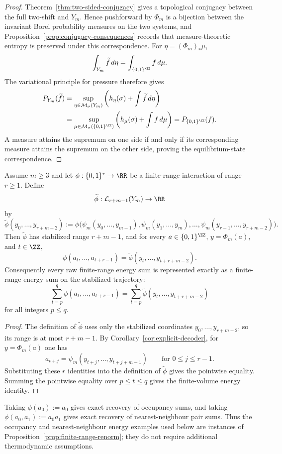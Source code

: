 \begin{proof}
Theorem~\ref{thm:two-sided-conjugacy} gives a topological conjugacy between
the full two-shift and $Y_m$.  Hence pushforward by $\Phi_m$ is a bijection
between the invariant Borel probability measures on the two systems, and
Proposition~\ref{prop:conjugacy-consequences} records that measure-theoretic
entropy is preserved under this correspondence.  For
$\eta=(\Phi_m)_*\mu$,
\[
\int_{Y_m}\widetilde f\,d\eta
=
\int_{\{0,1\}^{\ZZ}} f\,d\mu .
\]
The variational principle for pressure \cite{Walters1982} therefore gives
\[
\begin{aligned}
P_{Y_m}(\widetilde f)
&=\sup_{\eta\in\mathcal M_\sigma(Y_m)}
\left(h_\eta(\sigma)+\int\widetilde f\,d\eta\right)\\
&=\sup_{\mu\in\mathcal M_\sigma(\{0,1\}^{\ZZ})}
\left(h_\mu(\sigma)+\int f\,d\mu\right)
=P_{\{0,1\}^{\ZZ}}(f).
\end{aligned}
\]
A measure attains the supremum on one side if and only if its corresponding
measure attains the supremum on the other side, proving the equilibrium-state
correspondence.
\end{proof}

\begin{proposition}\label{prop:finite-range-renorm}
Assume $m\ge3$ and let $\phi:\{0,1\}^r\to\RR$ be a finite-range interaction
of range $r\ge1$.  Define
\[
\widetilde\phi:\mathcal L_{r+m-1}(Y_m)\to\RR
\]
by
\[
\widetilde\phi(y_0,\ldots,y_{r+m-2})
:=
\phi\bigl(
\psi_m(y_0,\ldots,y_{m-1}),
\psi_m(y_1,\ldots,y_m),
\ldots,
\psi_m(y_{r-1},\ldots,y_{r+m-2})
\bigr).
\]
Then $\widetilde\phi$ has stabilized range $r+m-1$, and for every
$a\in\{0,1\}^{\ZZ}$, $y=\Phi_m(a)$, and $t\in\ZZ$,
\[
\phi(a_t,\ldots,a_{t+r-1})
=
\widetilde\phi(y_t,\ldots,y_{t+r+m-2}).
\]
Consequently every raw finite-range energy sum is represented exactly as a
finite-range energy sum on the stabilized trajectory:
\[
\sum_{t=p}^{q}\phi(a_t,\ldots,a_{t+r-1})
=
\sum_{t=p}^{q}\widetilde\phi(y_t,\ldots,y_{t+r+m-2})
\]
for all integers $p\le q$.
\end{proposition}

\begin{proof}
The definition of $\widetilde\phi$ uses only the stabilized coordinates
$y_0,\ldots,y_{r+m-2}$, so its range is at most $r+m-1$.  By
Corollary~\ref{cor:explicit-decoder}, for $y=\Phi_m(a)$ one has
\[
a_{t+j}=\psi_m(y_{t+j},\ldots,y_{t+j+m-1})
\qquad\text{for }0\le j\le r-1.
\]
Substituting these $r$ identities into the definition of $\widetilde\phi$
gives the pointwise equality.  Summing the pointwise equality over
$p\le t\le q$ gives the finite-volume energy identity.
\end{proof}

\begin{remark}
Taking $\phi(a_0):=a_0$ gives exact recovery of occupancy sums, and taking
$\phi(a_0,a_1):=a_0a_1$ gives exact recovery of nearest-neighbour pair sums.
Thus the occupancy and nearest-neighbour energy examples used below are
instances of Proposition~\ref{prop:finite-range-renorm}; they do not require
additional thermodynamic assumptions.
\end{remark}
